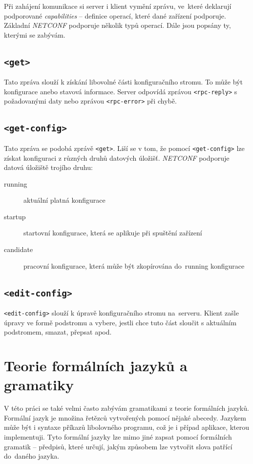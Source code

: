 \documentclass[thesis=B,czech,hidelinks]{FITthesis}[2019/03/06]
\begin{document}
Při zahájení komunikace si server i klient vymění  zprávu, ve~které deklarují podporované \textit{capabilities} -- definice operací, které dané zařízení podporuje. Základní \textit{NETCONF} podporuje několik typů operací. Dále jsou popsány ty, kterými se zabývám.

\subsection{\texttt{<get>}}
Tato zpráva slouží k získání libovolné části konfiguračního stromu. To může být konfigurace anebo stavová informace. Server odpovídá zprávou \texttt{<rpc-reply>} s požadovanými daty nebo zprávou \texttt{<rpc-error>} při chybě.

\subsection{\texttt{<get-config>}}
Tato zpráva se podobá zprávě \texttt{<get>}. Liší se v tom, že pomocí \texttt{<get-config>} lze získat konfiguraci z různých druhů datových úložišť. \textit{NETCONF} podporuje datová úložiště trojího druhu:
\begin{description}
    \item[running]{aktuální platná konfigurace}
    \item[startup]{startovní konfigurace, která se aplikuje při spuštění zařízení}
    \item[candidate]{pracovní konfigurace, která může být zkopírována do~running konfigurace}
\end{description}

\subsection{\texttt{<edit-config>}}
\texttt{<edit-config>} slouží k úpravě konfiguračního stromu na~serveru. Klient zašle úpravy ve formě podstromu a vybere, jestli chce tuto část sloučit s aktuálním podstromem, smazat, přepsat apod.

\section{Teorie formálních jazyků a gramatiky}
V této práci se také velmi často zabývám gramatikami z teorie formálních jazyků. Formální jazyk je množina řetězců vytvořených pomocí nějaké abecedy. Jazykem může být i syntaxe příkazů libolovného programu, což je i případ aplikace, kterou implementuji. Tyto formální jazyky lze mimo jiné zapsat pomocí formálních gramatik -- předpisů, které určují, jakým způsobem  lze vytvořit slova patřící do~daného jazyka.\,\cite{formal-languages}
\end{document}
